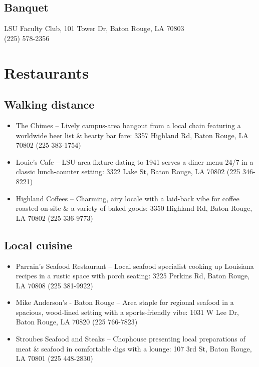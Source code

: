 \documentclass[12pt,letterpaper]{book}
\begin{document}
\subsection*{Banquet}
LSU Faculty Club, 101 Tower Dr, Baton Rouge, LA 70803 \\
(225) 578-2356

\section{Restaurants}

\subsection*{Walking distance}

\begin{itemize}
\item The Chimes -- Lively campus-area hangout from a local chain featuring a worldwide beer list \& hearty bar fare: 3357 Highland Rd, Baton Rouge, LA 70802 (225 383-1754)
\item Louie's Cafe -- LSU-area fixture dating to 1941 serves a diner menu 24/7 in a classic lunch-counter setting: 3322 Lake St, Baton Rouge, LA 70802 (225 346-8221)
\item Highland Coffees -- Charming, airy locale with a laid-back vibe for coffee roasted on-site \& a variety of baked goods: 3350 Highland Rd, Baton Rouge, LA 70802 (225 336-9773)
\end{itemize}

\subsection*{Local cuisine}

\begin{itemize}
\item Parrain's Seafood Restaurant -- Local seafood specialist cooking up Louisiana recipes in a rustic space with porch seating: 3225 Perkins Rd, Baton Rouge, LA 70808 (225 381-9922)
\item Mike Anderson's - Baton Rouge -- Area staple for regional seafood in a spacious, wood-lined setting with a sports-friendly vibe: 1031 W Lee Dr, Baton Rouge, LA 70820 (225 766-7823)
\item Stroubes Seafood and Steaks -- Chophouse presenting local preparations of meat \& seafood in comfortable digs with a lounge: 107 3rd St, Baton Rouge, LA 70801 (225 448-2830)
\end{itemize}


\backmatter
\renewcommand{\indexname}{Author Index}
\printindex
\newpage
\doclicenseThis 
\end{document}

